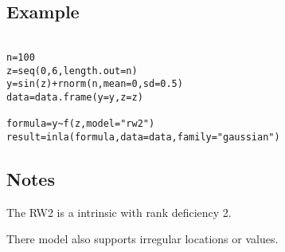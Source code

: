 \documentclass[a4paper,11pt]{article}
\begin{document}
\subsection*{Example}

\begin{verbatim}

n=100
z=seq(0,6,length.out=n)
y=sin(z)+rnorm(n,mean=0,sd=0.5)
data=data.frame(y=y,z=z)

formula=y~f(z,model="rw2")
result=inla(formula,data=data,family="gaussian")
\end{verbatim}


\subsection*{Notes}

The RW2 is a intrinsic with rank deficiency 2.

There model also supports irregular locations or values.
\end{document}
